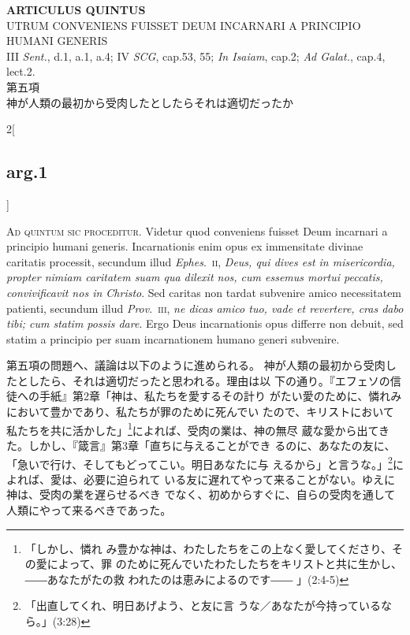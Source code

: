 \documentclass[paper=a4paper,fontsize=10pt,jafontsize=9pt,titlepage]{jlreq}
\begin{document}
\begin{center}
 {\Large {\bfseries ARTICULUS QUINTUS}}\\
 {\large UTRUM CONVENIENS FUISSET DEUM INCARNARI A PRINCIPIO HUMANI GENERIS}\\
 {\footnotesize III {\itshape Sent.}, d.1, a.1, a.4; IV {\itshape SCG},
 cap.53, 55; {\itshape In Isaiam}, cap.2; {\itshape Ad Galat.}, cap.4, lect.2.}\\
 {\Large 第五項\\神が人類の最初から受肉したとしたらそれは適切だったか}
\end{center}

\begin{paracol}{2}[\subsection{arg.1}]

{\Huge A}{\scshape d quintum sic proceditur}. Videtur quod
conveniens fuisset Deum incarnari a principio humani
generis. Incarnationis enim opus ex immensitate divinae caritatis
processit, secundum illud {\itshape Ephes}.~{\scshape ii}, {\itshape Deus, qui dives est in
misericordia, propter nimiam caritatem suam qua dilexit nos, cum essemus
mortui peccatis, convivificavit nos in Christo}. Sed caritas non tardat
subvenire amico necessitatem patienti, secundum illud {\itshape Prov}.~{\scshape iii}, {\itshape ne
dicas amico tuo, vade et revertere, cras dabo tibi; cum statim possis
dare}. Ergo Deus incarnationis opus differre non debuit, sed statim a
principio per suam incarnationem humano generi subvenire.

\switchcolumn

第五項の問題へ、議論は以下のように進められる。
神が人類の最初から受肉したとしたら、それは適切だったと思われる。理由は以
 下の通り。『エフェソの信徒への手紙』第2章「神は、私たちを愛するその計り
 がたい愛のために、憐れみにおいて豊かであり、私たちが罪のために死んでい
 たので、キリストにおいて私たちを共に活かした」\footnote{「しかし、憐れ
 み豊かな神は、わたしたちをこの上なく愛してくださり、その愛によって、罪
 のために死んでいたわたしたちをキリストと共に生かし、――あなたがたの救
 われたのは恵みによるのです―― 」(2:4-5)}によれば、受肉の業は、神の無尽
 蔵な愛から出てきた。しかし、『箴言』第3章「直ちに与えることができ
 るのに、あなたの友に、「急いで行け、そしてもどってこい。明日あなたに与
 えるから」と言うな。」\footnote{「出直してくれ、明日あげよう、と友に言
 うな／あなたが今持っているなら。」(3:28)}によれば、愛は、必要に迫られて
 いる友に遅れてやって来ることがない。ゆえに神は、受肉の業を遅らせるべき
 でなく、初めからすぐに、自らの受肉を通して人類にやって来るべきであった。


\end{paracol}
\end{document}
